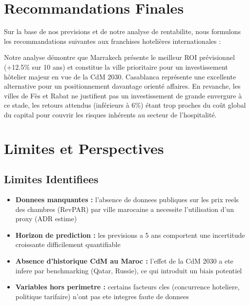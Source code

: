 \documentclass[12pt,a4paper]{report}
\begin{document}
\begin{itemize}[leftmargin=1.5em]
\section{Recommandations Finales}

Sur la base de nos previsions et de notre analyse de rentabilite,
nous formulons les recommandations suivantes aux franchises hotelières
internationales :

\begin{result_box}
Notre analyse démontre que Marrakech présente le meilleur ROI prévisionnel (+12.5\% sur 10 ans) et constitue la ville prioritaire pour un investissement hôtelier majeur en vue de la CdM 2030. Casablanca représente une excellente alternative pour un positionnement davantage orienté affaires. En revanche, les villes de Fès et Rabat ne justifient pas un investissement de grande envergure à ce stade, les retours attendus (inférieurs à 6\%) étant trop proches du coût global du capital pour couvrir les risques inhérents au secteur de l'hospitalité.
\end{result_box}

\section{Limites et Perspectives}

\subsection{Limites Identifiees}

\begin{itemize}[leftmargin=1.5em]
  \item \textbf{Donnees manquantes :} l'absence de donnees publiques
        sur les prix reels des chambres (RevPAR) par ville marocaine
        a necessite l'utilisation d'un proxy (ADR estime)
  \item \textbf{Horizon de prediction :} les previsions a 5 ans
        comportent une incertitude croissante difficilement quantifiable
  \item \textbf{Absence d'historique CdM au Maroc :} l'effet de la
        CdM 2030 a ete infere par benchmarking (Qatar, Russie),
        ce qui introduit un biais potentiel
  \item \textbf{Variables hors perimetre :} certains facteurs cles
        (concurrence hoteliere, politique tarifaire) n'ont pas ete
        integres faute de donnees
\end{itemize}


\end{itemize}
\end{document}
